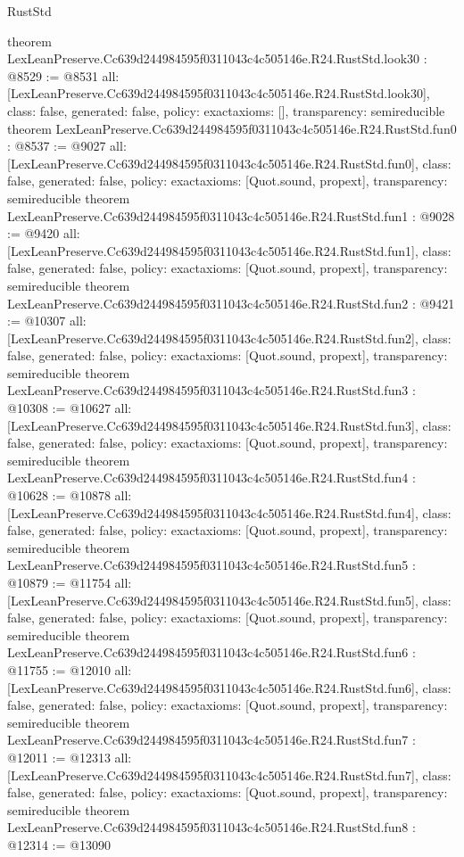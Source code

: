 \begin{lexlean}{RustStd}
\begin{coremodule}
{}
theorem LexLeanPreserve.Cc639d244984595f0311043c4c505146e.R24.RustStd.look30 : @8529 := @8531 {
  all: [LexLeanPreserve.Cc639d244984595f0311043c4c505146e.R24.RustStd.look30],
  class: false,
  generated: false,
  policy: exact{axioms: []},
  transparency: semireducible
}
theorem LexLeanPreserve.Cc639d244984595f0311043c4c505146e.R24.RustStd.fun0 : @8537 := @9027 {
  all: [LexLeanPreserve.Cc639d244984595f0311043c4c505146e.R24.RustStd.fun0],
  class: false,
  generated: false,
  policy: exact{axioms: [Quot.sound, propext]},
  transparency: semireducible
}
theorem LexLeanPreserve.Cc639d244984595f0311043c4c505146e.R24.RustStd.fun1 : @9028 := @9420 {
  all: [LexLeanPreserve.Cc639d244984595f0311043c4c505146e.R24.RustStd.fun1],
  class: false,
  generated: false,
  policy: exact{axioms: [Quot.sound, propext]},
  transparency: semireducible
}
theorem LexLeanPreserve.Cc639d244984595f0311043c4c505146e.R24.RustStd.fun2 : @9421 := @10307 {
  all: [LexLeanPreserve.Cc639d244984595f0311043c4c505146e.R24.RustStd.fun2],
  class: false,
  generated: false,
  policy: exact{axioms: [Quot.sound, propext]},
  transparency: semireducible
}
theorem LexLeanPreserve.Cc639d244984595f0311043c4c505146e.R24.RustStd.fun3 : @10308 := @10627 {
  all: [LexLeanPreserve.Cc639d244984595f0311043c4c505146e.R24.RustStd.fun3],
  class: false,
  generated: false,
  policy: exact{axioms: [Quot.sound, propext]},
  transparency: semireducible
}
theorem LexLeanPreserve.Cc639d244984595f0311043c4c505146e.R24.RustStd.fun4 : @10628 := @10878 {
  all: [LexLeanPreserve.Cc639d244984595f0311043c4c505146e.R24.RustStd.fun4],
  class: false,
  generated: false,
  policy: exact{axioms: [Quot.sound, propext]},
  transparency: semireducible
}
theorem LexLeanPreserve.Cc639d244984595f0311043c4c505146e.R24.RustStd.fun5 : @10879 := @11754 {
  all: [LexLeanPreserve.Cc639d244984595f0311043c4c505146e.R24.RustStd.fun5],
  class: false,
  generated: false,
  policy: exact{axioms: [Quot.sound, propext]},
  transparency: semireducible
}
theorem LexLeanPreserve.Cc639d244984595f0311043c4c505146e.R24.RustStd.fun6 : @11755 := @12010 {
  all: [LexLeanPreserve.Cc639d244984595f0311043c4c505146e.R24.RustStd.fun6],
  class: false,
  generated: false,
  policy: exact{axioms: [Quot.sound, propext]},
  transparency: semireducible
}
theorem LexLeanPreserve.Cc639d244984595f0311043c4c505146e.R24.RustStd.fun7 : @12011 := @12313 {
  all: [LexLeanPreserve.Cc639d244984595f0311043c4c505146e.R24.RustStd.fun7],
  class: false,
  generated: false,
  policy: exact{axioms: [Quot.sound, propext]},
  transparency: semireducible
}
theorem LexLeanPreserve.Cc639d244984595f0311043c4c505146e.R24.RustStd.fun8 : @12314 := @13090 {
}
\end{coremodule}
\end{lexlean}
